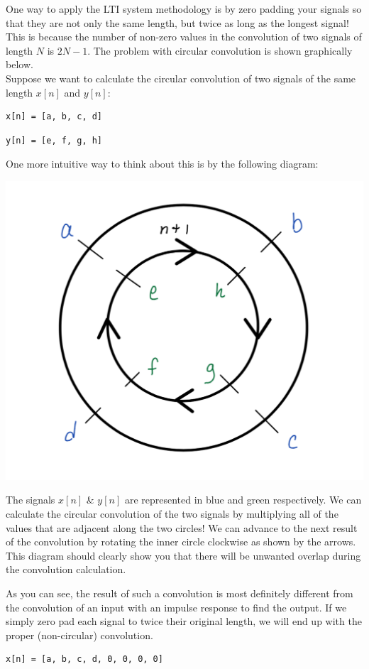 \documentclass[a4paper]{article}
\numberwithin{equation}{section}
\begin{document}
One way to apply the LTI system methodology is by zero padding your signals so that they are not only the same length, but twice as long as the longest signal! This is because the number of non-zero values in the convolution of two signals of length $N$ is $2N-1$. The problem with circular convolution is shown graphically below.\\

Suppose we want to calculate the circular convolution of two signals of the same length $x[n]$ and $y[n]$: 
\begin{verbatim}
x[n] = [a, b, c, d]
\end{verbatim}

\begin{verbatim}
y[n] = [e, f, g, h]
\end{verbatim}

One more intuitive way to think about this is by the following diagram:
\begin{center}
\includegraphics[scale=0.485]{circ.png}
\end{center}
The signals $x[n]$ \& $y[n]$ are represented in blue and green respectively. We can calculate the circular convolution of the two signals by multiplying all of the values that are adjacent along the two circles! We can advance to the next result of the convolution by rotating the inner circle clockwise as shown by the arrows. This diagram should clearly show you that there will be unwanted overlap during the convolution calculation. 

As you can see, the result of such a convolution is most definitely different from the convolution of an input with an impulse response to find the output. If we simply zero pad each signal to twice their original length, we will end up with the proper (non-circular) convolution.
\begin{verbatim}
x[n] = [a, b, c, d, 0, 0, 0, 0]
\end{verbatim}
\end{document}
